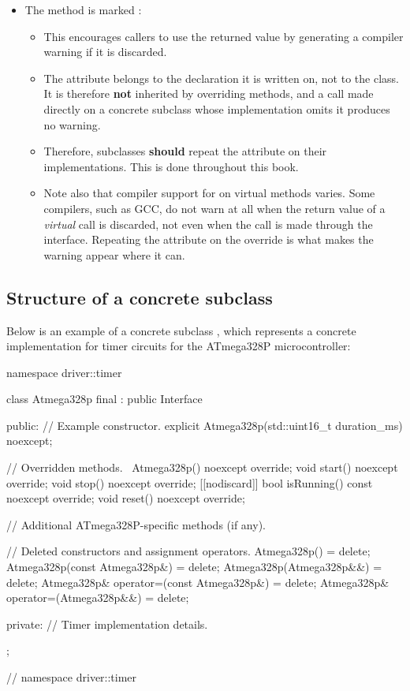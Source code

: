 \begin{itemize}
  \item The method  is marked \code{[[nodiscard]]}:
  \begin{itemize}
    \item This encourages callers to use the returned value by generating a compiler warning if it
      is discarded.
    \item The attribute belongs to the declaration it is written on, not to the class. It is
      therefore \textbf{not} inherited by overriding methods, and a call made directly on a
      concrete subclass whose implementation omits it produces no warning.
    \item Therefore, subclasses \textbf{should} repeat the \code{[[nodiscard]]} attribute on their
      implementations. This is done throughout this book.
    \item Note also that compiler support for \code{[[nodiscard]]} on virtual methods varies. Some
      compilers, such as GCC, do not warn at all when the return value of a \emph{virtual} call is
      discarded, not even when the call is made through the interface. Repeating the attribute on
      the override is what makes the warning appear where it can.
  \end{itemize}
\end{itemize}

\subsection{Structure of a concrete subclass}
\label{c3:sec:subclass}
Below is an example of a concrete subclass , which represents a
concrete implementation for timer circuits for the ATmega328P microcontroller:

\begin{cppcode}
namespace driver::timer
{
class Atmega328p final : public Interface
{
public:
    // Example constructor.
    explicit Atmega328p(std::uint16_t duration_ms) noexcept;

    // Overridden methods.
    ~Atmega328p() noexcept override;
    void start() noexcept override;
    void stop() noexcept override;
    [[nodiscard]] bool isRunning() const noexcept override;
    void reset() noexcept override;

    // Additional ATmega328P-specific methods (if any).

    // Deleted constructors and assignment operators.
    Atmega328p()                             = delete;
    Atmega328p(const Atmega328p&)            = delete;
    Atmega328p(Atmega328p&&)                 = delete;
    Atmega328p& operator=(const Atmega328p&) = delete;
    Atmega328p& operator=(Atmega328p&&)      = delete;

private:
    // Timer implementation details.
};
} // namespace driver::timer
\end{cppcode}

